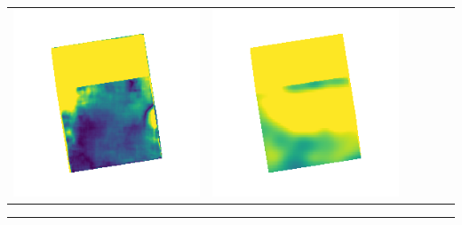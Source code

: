 \begin{center}
\begin{tabularx}{\linewidth}{@{}Y@{}Y@{}Y@{}Y@{}Y@{}Y@{}}
\includegraphics[width=\linewidth]{semisynthetic/20160617_0_marrnet_err.png} &
\includegraphics[width=\linewidth]{semisynthetic/20160617_0_ef_err.png} \\
\end{tabularx}
\begin{center}\rule{0.5\linewidth}{\linethickness}\end{center}


\end{center}
